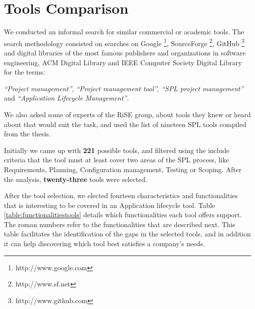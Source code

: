 \section{Tools Comparison}
\label{sc:relatedWork}

We conducted an informal search for similar commercial or academic tools. The search methodology consisted on searches on Google \footnote{http://www.google.com}, SourceForge \footnote{http://www.sf.net}, GitHub \footnote{http://www.github.com} and digital libraries of the most famous publishers and organizations in software engineering, ACM Digital Library and IEEE Computer Society Digital Library for the terms: 

\textit{“Project management”}, \textit{“Project management tool”}, \textit{“SPL project management”} and \textit{“Application Lifecycle Management”}. 

We also asked some of experts of the RiSE group, about tools they knew or heard about that would suit the task, and used the list of nineteen SPL tools compiled from the \cite{lisboa:msc:2008} thesis.

Initially we came up with \textbf{221} possible tools, and filtered using the include criteria that the tool must at least cover two areas of the \ac{SPL} process, like Requirements, Planning, Configuration management, Testing or Scoping. After the analysis, \textbf{twenty-three} tools were selected.

After the tool selection, we elected fourteen characteristics and functionalities that is interesting to be covered in an Application lifecycle tool. Table \ref{table:functionalitiestools} details which functionalities each tool offers support. The roman numbers refer to the functionalities that are described next. This table facilitates the identification of the gaps in the selected tools, and in addition it can help discovering which tool best satisfies a company’s needs.



